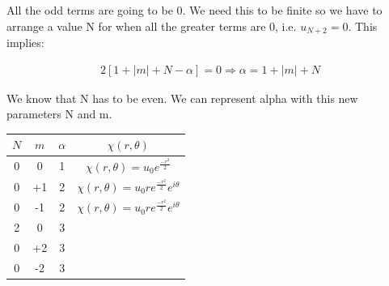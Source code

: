 All the odd terms are going to be 0. We need this to be finite so we have to arrange a value N for when all the greater terms are 0, i.e. $u_{N+2} = 0$. This implies:

\begin{equation}
  \begin{array}{c}
    2[1+|m|+N-\alpha] = 0 \Rightarrow \alpha= 1+|m|+N
  \end{array}
\end{equation}

We know that N has to be even. We can represent alpha with this new parameters N and m.

\begin{tabular}{| c | c | c | c |}
  \hline
  $N$ & $m$ & $\alpha$ & $\chi(r,\theta)$ \\
  \hline
  0 & 0 & 1  & $\chi(r,\theta) = u_0 e^{\frac{-r^2}{2}}$              \\
  \hline
  0 & +1 & 2 & $\chi(r,\theta) = u_0re^{\frac{-r^2}{2}}e^{i\theta}$   \\
  \hline
  0 & -1 & 2 & $\chi(r,\theta) = u_0 re^{\frac{-r^2}{2}}e^{i\theta}$  \\
  \hline
  2 & 0 & 3  & $ $ \\
  \hline
  0 & +2 & 3 & $ $ \\
  \hline
  0 & -2 & 3 & $ $ \\
  \hline
\end{tabular}




